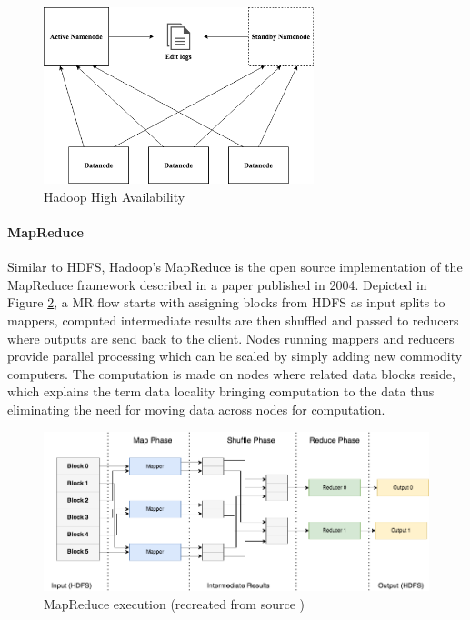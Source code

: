 \documentclass[review]{elsarticle}
\begin{document}
\begin{figure}[p]
	\centering
	\includegraphics[width=0.7\textwidth]{HadoopHA}
	\caption{Hadoop High Availability}
	\label{fig:HadoopHA}
\end{figure}

\paragraph{MapReduce} 
Similar to HDFS, Hadoop's MapReduce is the open source implementation of the MapReduce framework described in a paper \cite{dean_mapreduce_2004} published in 2004. Depicted in Figure \ref{fig:MapReduce}, a MR flow starts with assigning blocks from HDFS as input splits to mappers, computed intermediate results are then shuffled and passed to reducers where outputs are send back to the client. Nodes running mappers and reducers provide parallel processing which can be scaled by simply adding new commodity computers. The computation is made on nodes where related data blocks reside, which explains the term data locality bringing computation to the data thus eliminating the need for moving data across nodes for computation.

\begin{figure}[p]
	\includegraphics[width=\textwidth]{MapReduce}
	\caption{MapReduce execution (recreated from source \cite{schatzle_giant_nodate})}
	\label{fig:MapReduce}
	\centering
\end{figure}
\end{document}
